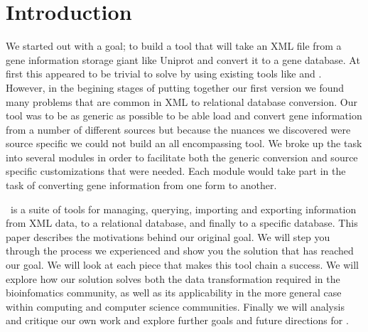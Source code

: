 \section{Introduction}
We started out with a goal; to build a tool that will take an XML file from a gene information storage giant like Uniprot and convert it to a \genmapp gene database. At first this appeared to be trivial to solve by using existing tools like  and \hibernate. However, in the begining stages of putting together our first version we found many problems that are common in XML to relational database conversion. Our tool was to be as generic as possible to be able load and convert gene information from a number of different sources but because the nuances we discovered were source specific we could not build an all encompassing tool. We broke up the task into several modules in order to facilitate both the generic conversion and source specific customizations that were needed.  Each module would take part in the task of converting gene information from one form to another.

\xmlpipedb~is a suite of tools for managing, querying, importing and exporting information from XML data, to a relational database, and finally to a \genmapp specific database. This paper describes the motivations behind our original goal.  We will step you through the process we experienced and show you the solution that has reached our goal. We will look at each piece that makes this tool chain a success.  We will explore how our solution solves both the data transformation required in the bioinfomatics community, as well as its applicability in the more general case within computing and computer science communities.  Finally we will analysis and critique our own work and explore further goals and future directions for \xmlpipedb.
